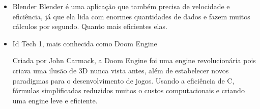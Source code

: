 \begin{itemize}
    \item Blender
    Blender é uma aplicação que também precisa de velocidade e eficiência, já que ela lida com enormes quantidades de dados e fazem muitos cálculos por 
    segundo. Quanto mais eficientes elas. 
    \nocite{Blender}

    \item Id Tech 1, mais conhecida como Doom Engine
    
    Criada por John Carmack, a Doom Engine foi uma engine revolucionária pois 
    criava uma ilusão de 3D nunca vista antes, além de estabelecer novos paradigmas
    para o desenvolvimento de jogos. Usando a eficiência de C, fórmulas simplificadas 
    reduzidos muitos o custos computacionais e criando uma engine leve e eficiente.   
    \nocite{RETROCOMPATIBILIDADE}
    \nocite{Id_Tech} 

\end{itemize}

\newpage